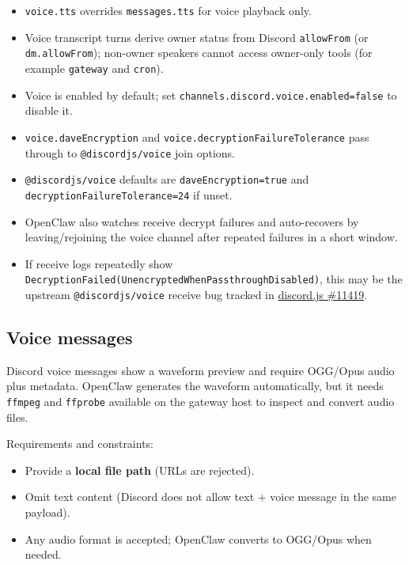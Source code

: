 \begin{itemize}
  \item \texttt{voice.tts} overrides \texttt{messages.tts} for voice playback only.
  \item Voice transcript turns derive owner status from Discord \texttt{allowFrom} (or \texttt{dm.allowFrom}); non-owner speakers cannot access owner-only tools (for example \texttt{gateway} and \texttt{cron}).
  \item Voice is enabled by default; set \texttt{channels.discord.voice.enabled=false} to disable it.
  \item \texttt{voice.daveEncryption} and \texttt{voice.decryptionFailureTolerance} pass through to \texttt{@discordjs/voice} join options.
  \item \texttt{@discordjs/voice} defaults are \texttt{daveEncryption=true} and \texttt{decryptionFailureTolerance=24} if unset.
  \item OpenClaw also watches receive decrypt failures and auto-recovers by leaving/rejoining the voice channel after repeated failures in a short window.
  \item If receive logs repeatedly show \texttt{DecryptionFailed(UnencryptedWhenPassthroughDisabled)}, this may be the upstream \texttt{@discordjs/voice} receive bug tracked in \href{https://github.com/discordjs/discord.js/issues/11419}{discord.js \#11419}.
\end{itemize}


\subsection{Voice messages}


Discord voice messages show a waveform preview and require OGG/Opus audio plus metadata. OpenClaw generates the waveform automatically, but it needs \texttt{ffmpeg} and \texttt{ffprobe} available on the gateway host to inspect and convert audio files.

Requirements and constraints:

\begin{itemize}
  \item Provide a \textbf{local file path} (URLs are rejected).
  \item Omit text content (Discord does not allow text + voice message in the same payload).
  \item Any audio format is accepted; OpenClaw converts to OGG/Opus when needed.
\end{itemize}


